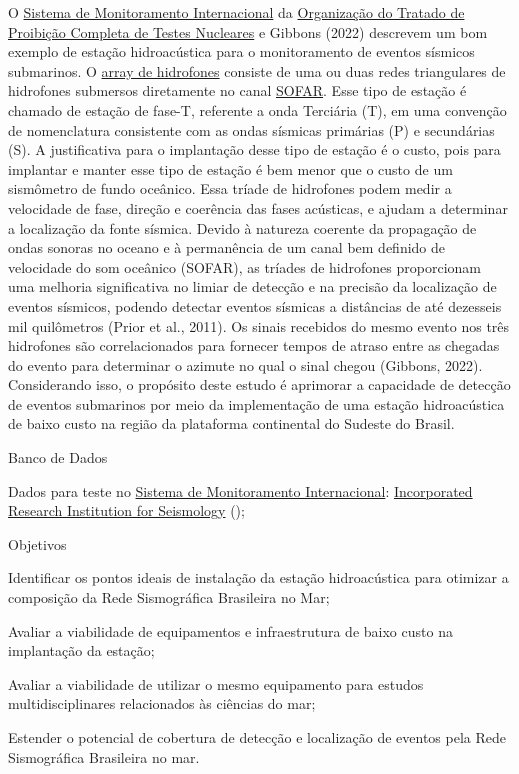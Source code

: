 \documentclass[10pt,a4paper,oneside]{book}
\begin{document}
O \href{https://www.ctbto.org/our-work/international-monitoring-system}{Sistema de Monitoramento Internacional} da \href{https://funag.gov.br/biblioteca/download/934-Tratado_de_Proibicao_Completa_dos_Testes_Nucleares_CTBT.pdf}{Organização do Tratado de Proibição Completa de Testes Nucleares} e Gibbons (2022) descrevem um bom exemplo de estação hidroacústica para o monitoramento de eventos sísmicos submarinos. O \href{https://www.ctbto.org/our-work/monitoring-technologies/hydroacoustic-monitoring}{array de hidrofones} consiste de uma ou duas redes triangulares de hidrofones submersos diretamente no canal \href{https://pt.wikipedia.org/wiki/Canal_SOFAR}{SOFAR}. Esse tipo de estação é chamado de estação de fase-T, referente a onda Terciária (T), em uma convenção de nomenclatura consistente com as ondas sísmicas primárias (P) e secundárias (S). A justificativa para o implantação desse tipo de estação é o custo, pois para implantar e manter esse tipo de estação é bem menor que o custo de um sismômetro de fundo oceânico. Essa tríade de hidrofones podem medir a velocidade de fase, direção e coerência das fases acústicas, e ajudam a determinar a localização da fonte sísmica. Devido à natureza coerente da propagação de ondas sonoras no oceano e à permanência de um canal bem definido de velocidade do som oceânico (SOFAR), as tríades de hidrofones proporcionam uma melhoria significativa no limiar de detecção e na precisão da localização de eventos sísmicos, podendo detectar eventos sísmicas a distâncias de até dezesseis mil quilômetros (Prior et al., 2011). Os sinais recebidos do mesmo evento nos três hidrofones são correlacionados para fornecer tempos de atraso entre as chegadas do evento para determinar o azimute no qual o sinal chegou (Gibbons, 2022). Considerando isso, o propósito deste estudo é aprimorar a capacidade de detecção de eventos submarinos por meio da implementação de uma estação hidroacústica de baixo custo na região da plataforma continental do Sudeste do Brasil.

\begin{fancyenum}{\faDatabase}{Banco de Dados}
	\item Dados para teste no \href{https://www.ctbto.org/our-work/international-monitoring-system}{Sistema de Monitoramento Internacional}: \href{https://ds.iris.edu/gmap/\#network=IM\&planet=earth}{Incorporated Research Institution for Seismology} (\faUnlock);
\end{fancyenum}

\begin{fancyenum}{\faFutbol}{Objetivos}
	\item Identificar os pontos ideais de instalação da estação hidroacústica para otimizar a composição da Rede Sismográfica Brasileira no Mar;
	\item Avaliar a viabilidade de equipamentos e infraestrutura de baixo custo na implantação da estação;
	\item Avaliar a viabilidade de utilizar o mesmo equipamento para estudos multidisciplinares relacionados às ciências do mar;
	\item Estender o potencial de cobertura de detecção e localização de eventos pela Rede Sismográfica Brasileira no mar.
\end{fancyenum}
\end{document}
